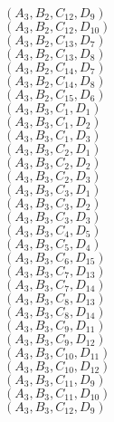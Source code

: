 \documentclass[14pt]{article}
\begin{document}
    $({A}_{3}, {B}_{2}, {C}_{12}, {D}_{9}) $ \\ 
    $({A}_{3}, {B}_{2}, {C}_{12}, {D}_{10}) $ \\ 
    $({A}_{3}, {B}_{2}, {C}_{13}, {D}_{7}) $ \\ 
    $({A}_{3}, {B}_{2}, {C}_{13}, {D}_{8}) $ \\ 
    $({A}_{3}, {B}_{2}, {C}_{14}, {D}_{7}) $ \\ 
    $({A}_{3}, {B}_{2}, {C}_{14}, {D}_{8}) $ \\ 
    $({A}_{3}, {B}_{2}, {C}_{15}, {D}_{6}) $ \\ 
    $({A}_{3}, {B}_{3}, {C}_{1}, {D}_{1}) $ \\ 
    $({A}_{3}, {B}_{3}, {C}_{1}, {D}_{2}) $ \\ 
    $({A}_{3}, {B}_{3}, {C}_{1}, {D}_{3}) $ \\ 
    $({A}_{3}, {B}_{3}, {C}_{2}, {D}_{1}) $ \\ 
    $({A}_{3}, {B}_{3}, {C}_{2}, {D}_{2}) $ \\ 
    $({A}_{3}, {B}_{3}, {C}_{2}, {D}_{3}) $ \\ 
    $({A}_{3}, {B}_{3}, {C}_{3}, {D}_{1}) $ \\ 
    $({A}_{3}, {B}_{3}, {C}_{3}, {D}_{2}) $ \\ 
    $({A}_{3}, {B}_{3}, {C}_{3}, {D}_{3}) $ \\ 
    $({A}_{3}, {B}_{3}, {C}_{4}, {D}_{5}) $ \\ 
    $({A}_{3}, {B}_{3}, {C}_{5}, {D}_{4}) $ \\ 
    $({A}_{3}, {B}_{3}, {C}_{6}, {D}_{15}) $ \\ 
    $({A}_{3}, {B}_{3}, {C}_{7}, {D}_{13}) $ \\ 
    $({A}_{3}, {B}_{3}, {C}_{7}, {D}_{14}) $ \\ 
    $({A}_{3}, {B}_{3}, {C}_{8}, {D}_{13}) $ \\ 
    $({A}_{3}, {B}_{3}, {C}_{8}, {D}_{14}) $ \\ 
    $({A}_{3}, {B}_{3}, {C}_{9}, {D}_{11}) $ \\ 
    $({A}_{3}, {B}_{3}, {C}_{9}, {D}_{12}) $ \\ 
    $({A}_{3}, {B}_{3}, {C}_{10}, {D}_{11}) $ \\ 
    $({A}_{3}, {B}_{3}, {C}_{10}, {D}_{12}) $ \\ 
    $({A}_{3}, {B}_{3}, {C}_{11}, {D}_{9}) $ \\ 
    $({A}_{3}, {B}_{3}, {C}_{11}, {D}_{10}) $ \\ 
    $({A}_{3}, {B}_{3}, {C}_{12}, {D}_{9}) $ \\ 
\end{document}
